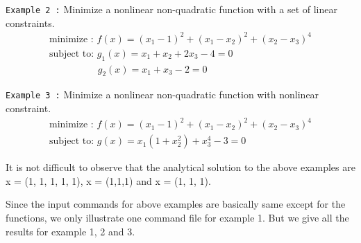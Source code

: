\vspace{0.10 in}\noindent
{\tt Example 2 :} Minimize a nonlinear non-quadratic function with a set of linear constraints.
\begin{equation}
\begin{array}{l}
 \mbox{minimize  : } f(x)   = (x_1-1)^2+(x_1-x_2)^2+(x_2-x_3)^4 \\
 \mbox{subject to: } g_1(x) = x_1+x_2+2x_3 -4 = 0 \\
 \mbox{~~~~~~~~~~~~~~~} g_2(x) = x_1+x_3       -2 = 0          
\end{array}
\end{equation}

\vspace{0.10 in}\noindent
{\tt Example 3 :} Minimize a nonlinear non-quadratic function with nonlinear constraint.
\begin{equation}
\begin{array}{l}
 \mbox{minimize  : } f(x) = (x_1-1)^2+(x_1-x_2)^2+(x_2-x_3)^4 \\
 \mbox{subject to: } g(x) =  x_1(1+x_2^2)+x_3^4-3 = 0
\end{array}
\end{equation}

\vspace{0.15 in}\noindent
It is not difficult to observe that the analytical solution to the 
above examples are x = (1, 1, 1, 1, 1), x = (1,1,1) and x = (1, 1, 1).

\vspace{0.15 in}
\noindent\hspace{0.5 in}
Since the input commands for above examples are basically same except for 
the functions, we only illustrate one command file for example 1. But we give
all the results for example 1, 2 and 3.

